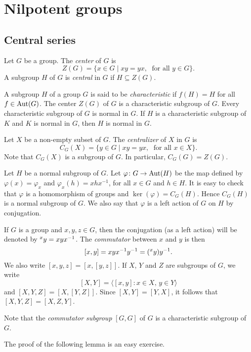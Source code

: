 \chapter{Nilpotent groups}
\label{nilpotent}

\section*{Central series}

Let $G$ be a group. The {\em center} of $G$ is 
\[ Z(G)=\{ x\in G\mid xy=yx,\; \mbox{ for all } y\in G\}.\]
A subgroup $H$ of $G$ is {\em central} in $G$ if $H\subseteq Z(G)$. 

A subgroup $H$ of a group $G$ is said to be {\em characteristic} if 
$f(H)= H$ for all $f\in\operatorname{Aut}(G)$. The center $Z(G)$ of $G$ is a characteristic subgroup of $G$. Every characteristic subgroup of $G$ is normal in $G$. 
If $H$ is a characteristic subgroup of $K$ and $K$ is normal in $G$, 
then $H$ is normal in $G$. 


 Let $X$ be a non-empty subset of $G$. The {\em centralizer} of $X$ in $G$ is
\[ C_G(X)=\{ y\in G\mid xy=yx,\;\mbox{ for all }x\in X\}.
\]
Note that $C_G(X)$ is a subgroup of $G$. In particular, $C_G(G)=Z(G)$.

Let $H$ be a normal subgroup of $G$. Let $\varphi\colon G\rightarrow \operatorname{Aut}(H)$ be the map defined by $\varphi(x)=\varphi_x$ and
$\varphi_x(h)=xhx^{-1}$, for all $x\in G$ and $h\in H$. It is easy to check that $\varphi$ is a homomorphism of groups and $\ker(\varphi)=C_G(H)$. Hence $C_G(H)$ is a normal subgroup of $G$. We also say that $\varphi$ is a left action of $G$ on $H$ by conjugation.


If $G$ is a group and $x,y,z\in G$, then the conjugation (as a left action) will be denoted
by $\prescript{x}{}y=xyx^{-1}$.  The {\em commutator} between $x$ and $y$ is then 
\[
[x,y]=xyx^{-1}y^{-1}=(\prescript{x}{}y)y^{-1}.
\]
We also write 
$[x,y,z]=[x,[y,z]]$. 
If $X$, $Y$ and $Z$ are subgroups of $G$, we write 
\[
[X,Y]=\langle [x,y]:x\in X,\,y\in Y\rangle
\]
and $[X,Y,Z]=\left[ X,[Y,Z] \right]$. Since $[X,Y]=[Y,X]$, it follows that  
$[X,Y,Z]=[X,Z,Y]$. 

 Note that the {\em commutator subgroup} $[G,G]$ of $G$ is a characteristic subgroup of $G$.

The proof of the following lemma is an easy exercise.

